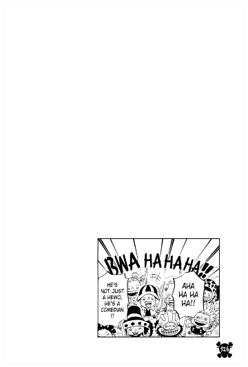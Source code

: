 \begin{figure}[htbp]
\begin{subfigure}[b]{0.25\textwidth}
    \end{subfigure}
    \hfill
    \begin{subfigure}[b]{0.2\textwidth}
        \includegraphics[width=\textwidth]{chapter/output/bw205.png}
       

\end{subfigure}
\end{figure}

